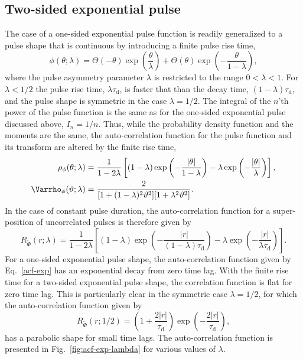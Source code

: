 \documentclass[aps,prb,12pt,a4paper,preprint,amsmath,amssymb,groupedaddress]{revtex4-1}
\newcommand{\abs}[1]{{\left|#1\right|}}\newcommand{\order}[1]{{\mathcal{O}\left(#1\right)}}
\newcommand{\taud}{\ensuremath{\tau_\text{d}}}
\newcommand{\Phiwt}{\ensuremath{\widetilde{\Phi}}}
\newcommand{\Eqref}[1]{Eq.~\eqref{#1}}
\newcommand{\Figref}[1]{Fig.~\ref{#1}}
\begin{document}
\subsection{Two-sided exponential pulse}



The case of a one-sided exponential pulse function is readily generalized to a pulse shape that is continuous by introducing a finite pulse rise time,\cite{theodorsen-ppcf,theodorsen-php,garcia-aps}
\begin{equation}\label{phi-dexp}
\phi(\theta;\lambda) = \Theta(-\theta)\exp\left( \frac{\theta}{\lambda} \right) + \Theta(\theta)\exp\left( -\frac{\theta}{1-\lambda} \right) ,
\end{equation}
where the pulse asymmetry parameter $\lambda$ is restricted to the range $0<\lambda<1$. For $\lambda<1/2$ the pulse rise time, $\lambda\taud$, is faster that than the decay time, $(1-\lambda)\taud$, and the pulse shape is symmetric in the case $\lambda=1/2$. The integral of the $n$'th power of the pulse function is the same as for the one-sided exponential pulse discussed above, $I_n=1/n$. Thus, while the probability density function and the moments are the same, the auto-correlation function for the pulse function and its transform are altered by the finite rise time,
\begin{subequations}\label{rhovar-dexp}
\begin{align}\label{rho-dexp}
\rho_\phi(\theta;\lambda) & = \frac{1}{1-2\lambda}\left[ (1-\lambda)\exp\left( -\frac{\abs{\theta}}{1-\lambda} \right) - \lambda\exp\left( -\frac{\abs{\theta}}{\lambda} \right) \right] ,
\\
\Varrho_\phi(\vartheta;\lambda) & = \frac{2}{[1+(1-\lambda)^2\vartheta^2][1+\lambda^2\vartheta^2]} . \label{varrho-dexp}
\end{align}
\end{subequations}
In the case of constant pulse duration, the auto-correlation function for a super-position of uncorrelated pulses is therefore given by\cite{theodorsen-ppcf}
\begin{equation}\label{acf-dexp}
R_{\Phiwt}(r;\lambda) = \frac{1}{1-2\lambda}\left[ (1-\lambda)\exp\left( -\frac{\abs{r}}{(1-\lambda)\taud} \right) - \lambda\exp\left( -\frac{\abs{r}}{\lambda\taud} \right) \right] .
\end{equation}
For a one-sided exponential pulse shape, the auto-correlation function given by \Eqref{acf-exp} has an exponential decay from zero time lag. With the finite rise time for a two-sided exponential pulse shape, the correlation function is flat for zero time lag. This is particularly clear in the symmetric case $\lambda=1/2$, for which the auto-correlation function given by
\begin{equation}
R_{\Phiwt}(r;1/2) = \left( 1+ \frac{2\abs{r}}{\taud} \right)\exp\left( - \frac{2\abs{r}}{\taud} \right) ,
\end{equation}
has a parabolic shape for small time lags. The auto-correlation function is presented in \Figref{fig:acf-exp-lambda} for various values of $\lambda$. 
\end{document}

